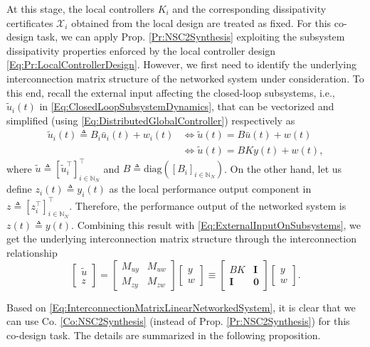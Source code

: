 \documentclass[letterpaper, 10 pt, conference]{ieeeconf}%
\newcommand{\N}{\mathbb{N}}
\newcommand{\T}{\top}
\newcommand{\I}{\mathbf{I}}
\newcommand{\0}{\mathbf{0}}
\newcommand{\X}{\mathcal{X}}
\newcommand{\diag}{\text{diag}}
\newcommand{\bm}[1]{\begin{bmatrix}#1\end{bmatrix}}
\begin{document}
At this stage, the local controllers \(K_i\) and the corresponding dissipativity certificates \(\X_i\) obtained from the local design are treated as fixed. For this co-design task, we can apply Prop. \ref{Pr:NSC2Synthesis} exploiting the subsystem dissipativity properties enforced by the local controller design \eqref{Eq:Pr:LocalControllerDesign}. However, we first need to identify the underlying interconnection matrix structure of the networked system under consideration. To this end, recall the external input affecting the closed-loop subsystems, i.e., $\tilde{u}_i(t)$ in \eqref{Eq:ClosedLoopSubsystemDynamics}, that can be vectorized and simplified (using \eqref{Eq:DistributedGlobalController}) respectively as
\begin{equation} \label{Eq:ExternalInputOnSubsystems}
\begin{aligned}
\tilde{u}_i(t) \triangleq B_i \bar{u}_i(t) + w_i(t) 
&\iff \tilde{u}(t) = B\bar{u}(t) + w(t) \\ 
&\iff \tilde{u}(t) = BKy(t) + w(t),
\end{aligned}
\end{equation}
where $\tilde{u} \triangleq [\tilde{u}_i^\T]_{i\in\N_N}^\T$ and $B \triangleq \diag([B_i]_{i\in\N_N})$. On the other hand, let us define $z_i(t) \triangleq y_i(t)$ as the local performance output component in $z \triangleq [z_i^\T]^\T_{i\in\N_N}$. Therefore, the performance output of the networked system is $z(t) \triangleq y(t)$. Combining this result with \eqref{Eq:ExternalInputOnSubsystems}, we get the underlying interconnection matrix structure through the interconnection relationship  
\begin{equation}\label{Eq:InterconnectionMatrixLinearNetworkedSystem}
\bm{\tilde{u}\\z} = \bm{M_{uy} & M_{uw} \\ M_{zy} & M_{zw}} \bm{y\\w} \equiv \bm{BK & \I \\ \I & \0}\bm{y\\w}. 
\end{equation}


Based on \eqref{Eq:InterconnectionMatrixLinearNetworkedSystem}, it is clear that we can use Co. \ref{Co:NSC2Synthesis} (instead of Prop. \ref{Pr:NSC2Synthesis}) for this co-design task. The details are summarized in the following proposition. 
\end{document}
